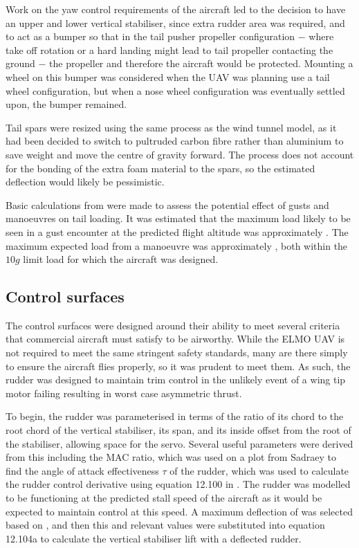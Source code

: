 \documentclass[../../main.tex]{subfiles}
\begin{document}
Work on the yaw control requirements of the aircraft led to the decision to have an upper and lower vertical stabiliser, since extra rudder area was required, and to act as a bumper so that in the tail pusher propeller configuration $-$ where take off rotation or a hard landing might lead to tail propeller contacting the ground $-$ the propeller and therefore the aircraft would be protected.
Mounting a wheel on this bumper was considered when the UAV was planning use a tail wheel configuration, but when a nose wheel configuration was eventually settled upon, the bumper remained. 

Tail spars were resized using the same process as the wind tunnel model, as it had been decided to switch to pultruded carbon fibre rather than aluminium to save weight and move the centre of gravity forward.
The process does not account for the bonding of the extra foam material to the spars, so the estimated deflection would likely be pessimistic.  

Basic calculations from \cite{bresloff-18} were made to assess the potential effect of gusts and manoeuvres on tail loading.
It was estimated that the maximum load likely to be seen in a gust encounter at the predicted flight altitude was approximately .
The maximum expected load from a manoeuvre was approximately , both within the $10g$ limit load for which the aircraft was designed. 

\subsection{Control surfaces} \label{sec:design-process:revised-design:control-surfaces}

The control surfaces were designed around their ability to meet several criteria that commercial aircraft must satisfy to be airworthy.
While the ELMO UAV is not required to meet the same stringent safety standards, many are there simply to ensure the aircraft flies properly, so it was prudent to meet them.
As such, the rudder was designed to maintain trim control in the unlikely event of a wing tip motor failing resulting in worst case asymmetric thrust.  

To begin, the rudder was parameterised in terms of the ratio of its chord to the root chord of the vertical stabiliser, its span, and its inside offset from the root of the stabiliser, allowing space for the servo.
Several useful parameters were derived from this including the MAC ratio, which was used on a plot from Sadraey \cite{sadraey-13} to find the angle of attack effectiveness $\tau$ of the rudder, which was used to calculate the rudder control derivative using equation 12.100 in \cite{sadraey-13}.
The rudder was modelled to be functioning at the predicted stall speed of the aircraft as it would be expected to maintain control at this speed.
A maximum deflection of  was selected based on \cite{sadraey-13}, and then this and relevant values were substituted into equation 12.104a \cite{sadraey-13} to calculate the vertical stabiliser lift with a deflected rudder. 
\end{document}
